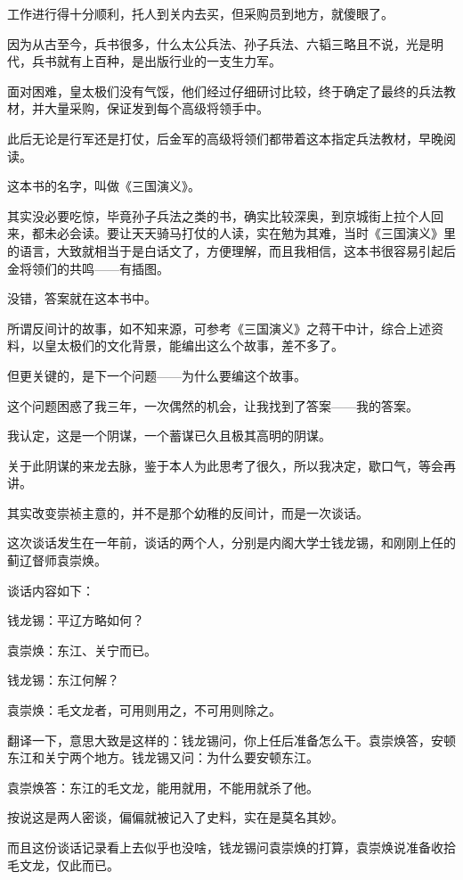 \begin{multicols}{\theparacolNo}
		工作进行得十分顺利，托人到关内去买，但采购员到地方，就傻眼了。

		因为从古至今，兵书很多，什么太公兵法、孙子兵法、六韬三略且不说，光是明代，兵书就有上百种，是出版行业的一支生力军。

		面对困难，皇太极们没有气馁，他们经过仔细研讨比较，终于确定了最终的兵法教材，并大量采购，保证发到每个高级将领手中。

		此后无论是行军还是打仗，后金军的高级将领们都带着这本指定兵法教材，早晚阅读。

		这本书的名字，叫做《三国演义》。

		其实没必要吃惊，毕竟孙子兵法之类的书，确实比较深奥，到京城街上拉个人回来，都未必会读。要让天天骑马打仗的人读，实在勉为其难，当时《三国演义》里的语言，大致就相当于是白话文了，方便理解，而且我相信，这本书很容易引起后金将领们的共鸣——有插图。

		没错，答案就在这本书中。

		所谓反间计的故事，如不知来源，可参考《三国演义》之蒋干中计，综合上述资料，以皇太极们的文化背景，能编出这么个故事，差不多了。

		但更关键的，是下一个问题——为什么要编这个故事。

		这个问题困惑了我三年，一次偶然的机会，让我找到了答案——我的答案。

		我认定，这是一个阴谋，一个蓄谋已久且极其高明的阴谋。

		关于此阴谋的来龙去脉，鉴于本人为此思考了很久，所以我决定，歇口气，等会再讲。

		其实改变崇祯主意的，并不是那个幼稚的反间计，而是一次谈话。

		这次谈话发生在一年前，谈话的两个人，分别是内阁大学士钱龙锡，和刚刚上任的蓟辽督师袁崇焕。

		谈话内容如下：

		钱龙锡：平辽方略如何？

		袁崇焕：东江、关宁而已。

		钱龙锡：东江何解？

		袁崇焕：毛文龙者，可用则用之，不可用则除之。

		翻译一下，意思大致是这样的：钱龙锡问，你上任后准备怎么干。袁崇焕答，安顿东江和关宁两个地方。钱龙锡又问：为什么要安顿东江。

		袁崇焕答：东江的毛文龙，能用就用，不能用就杀了他。

		按说这是两人密谈，偏偏就被记入了史料，实在是莫名其妙。

		而且这份谈话记录看上去似乎也没啥，钱龙锡问袁崇焕的打算，袁崇焕说准备收拾毛文龙，仅此而已。


\end{multicols}

